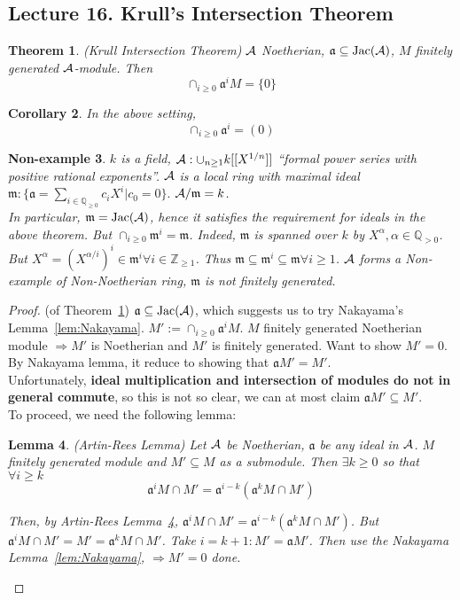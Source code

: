 \documentclass[11pt]{article}
\newtheorem{thm}{Theorem}[section]
\newtheorem{lemma}[thm]{Lemma}
\newtheorem{cor}[thm]{Corollary}
\newtheorem{nex}[thm]{Non-example}
\newcommand{\intg}{\mathbb Z}
\newcommand{\ratl}{\mathbb Q}
\newcommand{\sca}{{\mathfrak a}}
\newcommand{\scm}{{\mathfrak m}}
\newcommand{\cala}{{\cal A}}
\newcommand{\Lrta}{\Longrightarrow}
\begin{document}
\subsection{Lecture 16. Krull's Intersection Theorem}

\begin{thm}\label{thm:Krull_intersection}(Krull Intersection Theorem)
$\cala$ Noetherian, $\sca\subseteq \text{Jac}(\cala)$, $M$ finitely generated $\cala$-module.
Then
$$
\cap_{i\geq 0}\sca^i M=\{0\}
$$
\end{thm}
\begin{cor}
In the above setting, 
$$
\cap_{i\geq 0}\sca^i=(0)
$$
\end{cor}
\begin{nex}
$k$ is a field, $\cala:\cup_{n\geq 1}k[[X^{1/n}]]$ ``formal power series with positive rational exponents''. $\cala$ is a local ring with maximal ideal $\scm:\{\sca=\sum_{i\in\ratl_{\geq 0}}c_i X^i|c_0=0\}.$ $\cala/\scm=k$.\\
In particular, $\scm=\text{Jac}(\cala)$, hence it satisfies the requirement for ideals in the above theorem. But $\cap_{i\geq 0}\scm^i=\scm$. Indeed, $\scm$ is spanned over $k$  by $X^\alpha,\alpha\in\ratl_{>0}$. But $X^\alpha=(X^{\alpha/i})^i\in\scm^i\forall i\in\intg_{\geq 1}$. Thus $\scm\subseteq \scm^i\subseteq \scm\forall i\geq 1$. $\cala$ forms a Non-example of Non-Noetherian ring, $\scm$ is not finitely generated. 
\end{nex}

\begin{proof}(of Theorem~\ref{thm:Krull_intersection})
$\sca\subseteq \text{Jac}(\cala)$, which suggests us to  try Nakayama's Lemma~\ref{lem:Nakayama}.
$M':=\cap_{i\geq 0}\sca^i M.$ $M$ finitely generated Noetherian module $\Lrta M'$ is Noetherian and $M'$ is finitely generated. Want to show $M'=0$. By Nakayama lemma, it reduce to showing that $\sca M'=M'$.\\
Unfortunately, \textbf{ideal multiplication and intersection of modules do not in general commute}, so this is not so clear, we can at most claim $\sca M'\subseteq M'$.\\ 
To proceed, we need the following lemma:
\begin{lemma}\label{lem:Artin-Rees}
(Artin-Rees Lemma) Let $\cala$ be Noetherian, $\sca$ be any ideal in $\cala$. $M$ finitely generated module and $M'\subseteq M$ as a submodule. Then $\exists k\geq 0 $ so that $\forall i\geq k$
$$
\sca^i M\cap M'=\sca^{i-k}(\sca^k M\cap M')
$$

Then, by Artin-Rees Lemma~\ref{lem:Artin-Rees}, $\sca^i M\cap M'=\sca^{i-k}(\sca^k M\cap M')$. But $\sca^i M\cap M'=M'=\sca^k M\cap M'$. Take $i=k+1: M'=\sca M'$. Then use the Nakayama Lemma~\ref{lem:Nakayama}, $\Lrta M'=0$   done.
\end{lemma}
\end{proof}
\end{document}
